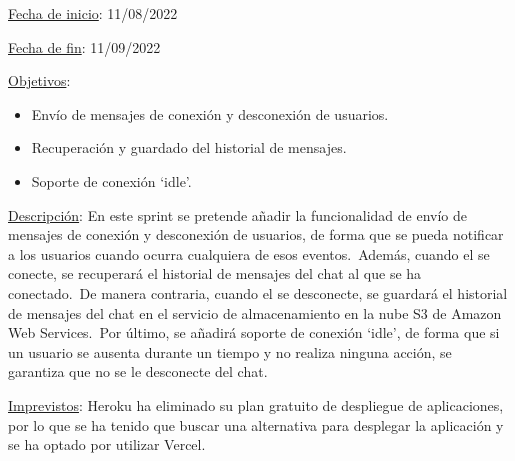 
\underline{Fecha de inicio}: 11/08/2022

\underline{Fecha de fin}: 11/09/2022

\underline{Objetivos}:
\begin{itemize}
	\item Envío de mensajes de conexión y desconexión de usuarios.
	\item Recuperación y guardado del historial de mensajes.
	\item Soporte de conexión \enquote*{idle}.
\end{itemize}

\underline{Descripción}:
En este sprint se pretende añadir la funcionalidad de envío de mensajes de conexión y desconexión de usuarios, de
forma que se pueda notificar a los usuarios cuando ocurra cualquiera de esos eventos.\ Además, cuando el
 se conecte, se recuperará el historial de mensajes del chat al que se ha conectado.\ De
manera contraria, cuando el  se desconecte, se guardará el historial de mensajes del chat en
el servicio de almacenamiento en la nube S3 de Amazon Web Services.\ Por último, se añadirá soporte de conexión
\enquote*{idle}, de forma que si un usuario se ausenta durante un tiempo y no realiza ninguna acción, se garantiza
que no se le desconecte del chat.

\underline{Imprevistos}:
Heroku ha eliminado su plan gratuito de despliegue de aplicaciones, por lo que se ha tenido que buscar una
alternativa para desplegar la aplicación y se ha optado por utilizar Vercel.


